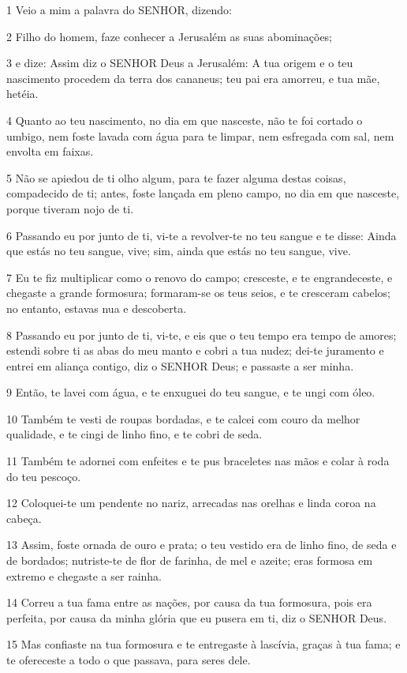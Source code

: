 \par 1 Veio a mim a palavra do SENHOR, dizendo:
\par 2 Filho do homem, faze conhecer a Jerusalém as suas abominações;
\par 3 e dize: Assim diz o SENHOR Deus a Jerusalém: A tua origem e o teu nascimento procedem da terra dos cananeus; teu pai era amorreu, e tua mãe, hetéia.
\par 4 Quanto ao teu nascimento, no dia em que nasceste, não te foi cortado o umbigo, nem foste lavada com água para te limpar, nem esfregada com sal, nem envolta em faixas.
\par 5 Não se apiedou de ti olho algum, para te fazer alguma destas coisas, compadecido de ti; antes, foste lançada em pleno campo, no dia em que nasceste, porque tiveram nojo de ti.
\par 6 Passando eu por junto de ti, vi-te a revolver-te no teu sangue e te disse: Ainda que estás no teu sangue, vive; sim, ainda que estás no teu sangue, vive.
\par 7 Eu te fiz multiplicar como o renovo do campo; cresceste, e te engrandeceste, e chegaste a grande formosura; formaram-se os teus seios, e te cresceram cabelos; no entanto, estavas nua e descoberta.
\par 8 Passando eu por junto de ti, vi-te, e eis que o teu tempo era tempo de amores; estendi sobre ti as abas do meu manto e cobri a tua nudez; dei-te juramento e entrei em aliança contigo, diz o SENHOR Deus; e passaste a ser minha.
\par 9 Então, te lavei com água, e te enxuguei do teu sangue, e te ungi com óleo.
\par 10 Também te vesti de roupas bordadas, e te calcei com couro da melhor qualidade, e te cingi de linho fino, e te cobri de seda.
\par 11 Também te adornei com enfeites e te pus braceletes nas mãos e colar à roda do teu pescoço.
\par 12 Coloquei-te um pendente no nariz, arrecadas nas orelhas e linda coroa na cabeça.
\par 13 Assim, foste ornada de ouro e prata; o teu vestido era de linho fino, de seda e de bordados; nutriste-te de flor de farinha, de mel e azeite; eras formosa em extremo e chegaste a ser rainha.
\par 14 Correu a tua fama entre as nações, por causa da tua formosura, pois era perfeita, por causa da minha glória que eu pusera em ti, diz o SENHOR Deus.
\par 15 Mas confiaste na tua formosura e te entregaste à lascívia, graças à tua fama; e te ofereceste a todo o que passava, para seres dele.
